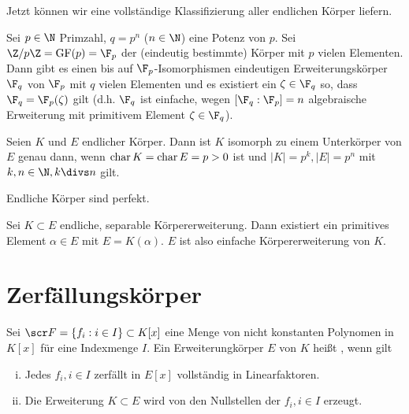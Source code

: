 Jetzt können wir eine vollständige Klassifizierung aller endlichen Körper liefern.

\begin{st} \label{19.2-3}
	Sei $p \in \N$ Primzahl, $q = p^n$ ($n \in \N$) eine Potenz von $p$.
	Sei $\Z / p\Z = \GF(p) = \F_p$ der (eindeutig bestimmte) Körper mit $p$ vielen Elementen.
	Dann gibt es einen bis auf $\F_p$-Isomorphismen eindeutigen Erweiterungskörper $\F_q$ von $\F_p$ mit $q$ vielen Elementen und es existiert ein $\zeta \in \F_q$ so, dass $\F_q = \F_p(\zeta)$ gilt (d.h. $\F_q$ ist einfache, wegen $[\F_q : \F_p] = n$ algebraische Erweiterung mit primitivem Element $\zeta \in \F_q$).
\end{st}

\begin{kor} \label{19.2-4}
	Seien $K$ und $E$ endlicher Körper.
	Dann ist $K$ isomorph zu einem Unterkörper von $E$ genau dann, wenn $\operatorname{char} K = \operatorname{char} E = p > 0$ ist und $|K| = p^k, |E| = p^n$ mit $k, n \in \N, k \divs n$ gilt.
\end{kor}

\begin{kor} \label{19.2-5}
	Endliche Körper sind perfekt.
\end{kor}

\begin{st}
	Sei $K \subset E$ endliche, separable Körpererweiterung.
	Dann existiert ein primitives Element $\alpha \in E$ mit $E = K(\alpha)$.
	$E$ ist also einfache Körpererweiterung von $K$.
\end{st}


\section{Zerfällungskörper}


\begin{df} \label{19.3-1}
	Sei $\scr F = \{ f_i : i \in I \} \subset K[x]$ eine Menge von nicht konstanten Polynomen in $K[x]$ für eine Indexmenge $I$.
	Ein Erweiterungkörper $E$ von $K$ heißt , wenn gilt
	\begin{enumerate}[i)]
		\item
			Jedes $f_i, i \in I$ zerfällt in $E[x]$ vollständig in Linearfaktoren.
		\item
			Die Erweiterung $K \subset E$ wird von den Nullstellen der $f_i, i \in I$ erzeugt.
	\end{enumerate}
\end{df}

